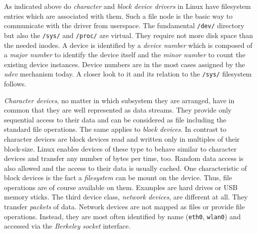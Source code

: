 As indicated above do \textit{character} and \textit{block device drivers} in Linux have filesystem entries which are associated with them.
Such a file node is the basic way to communicate with the driver from userspace.
The fundamental \texttt{/dev/} directory but also the \texttt{/sys/} and \texttt{/proc/} are virtual.
They require not more disk space than the needed inodes.
A device is identified by a \textit{device number} which is composed of a \textit{major number} to identify the device itself and the \textit{minor number} to count the existing device instances\cite{lfd430}.
Device numbers are in the most cases assigned by the \textit{udev} mechanism today.
A closer look to it and its relation to the \texttt{/sys/} filesystem follows.

\textit{Character devices}, no matter in which subsystem they are arranged, have in common that they are well represented as data streams.
They provide only sequential access to their data and can be considered as file including the standard file operations\cite{lfd430}.
The same applies to \textit{block devices}.
In contrast to character devices are block devices read and written only in multiples of their block-size.
Linux enables devices of these type to behave similar to character devices and transfer any number of bytes per time, too\cite{lfd430}.
Random data access is also allowed and the access to their data is usually cached.
One characteristic of block devices is the fact a \textit{filesystem} can be mount on the device.
Thus, file operations are of course available on them.
Examples are hard drives or USB memory sticks\cite{lfd430}.
The third device class, \textit{network devices}, are different at all.
They transfer \textit{packets} of data.
Network devices are not mapped as files or provide file operations.
Instead, they are most often identified by name (\texttt{eth0}, \texttt{wlan0}) and accessed via the \textit{Berkeley socket} interface\cite{lfd430}.

